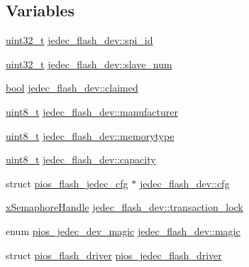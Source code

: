 \subsection*{Variables}
\begin{DoxyCompactItemize}
\item 
\hyperlink{stdint_8h_a435d1572bf3f880d55459d9805097f62}{uint32\-\_\-t} \hyperlink{group___p_i_o_s___f_l_a_s_h_ga0f87de9cf831cf45ad2e81d4629cf021}{jedec\-\_\-flash\-\_\-dev\-::spi\-\_\-id}
\item 
\hyperlink{stdint_8h_a435d1572bf3f880d55459d9805097f62}{uint32\-\_\-t} \hyperlink{group___p_i_o_s___f_l_a_s_h_ga38ca35aafe78e6032326184768221fab}{jedec\-\_\-flash\-\_\-dev\-::slave\-\_\-num}
\item 
\hyperlink{group___exported__types_gaf6a258d8f3ee5206d682d799316314b1}{bool} \hyperlink{group___p_i_o_s___f_l_a_s_h_ga0252ff9aa887c054e7299923b344bf59}{jedec\-\_\-flash\-\_\-dev\-::claimed}
\item 
\hyperlink{stdint_8h_aba7bc1797add20fe3efdf37ced1182c5}{uint8\-\_\-t} \hyperlink{group___p_i_o_s___f_l_a_s_h_gaf7bb5593bcefe3837116c4bdb768cd6e}{jedec\-\_\-flash\-\_\-dev\-::manufacturer}
\item 
\hyperlink{stdint_8h_aba7bc1797add20fe3efdf37ced1182c5}{uint8\-\_\-t} \hyperlink{group___p_i_o_s___f_l_a_s_h_ga68ce126b7f544ebb02fa8beab9b9faa2}{jedec\-\_\-flash\-\_\-dev\-::memorytype}
\item 
\hyperlink{stdint_8h_aba7bc1797add20fe3efdf37ced1182c5}{uint8\-\_\-t} \hyperlink{group___p_i_o_s___f_l_a_s_h_ga4253b6dd4128fd223d200bed60696804}{jedec\-\_\-flash\-\_\-dev\-::capacity}
\item 
struct \hyperlink{structpios__flash__jedec__cfg}{pios\-\_\-flash\-\_\-jedec\-\_\-cfg} $\ast$ \hyperlink{group___p_i_o_s___f_l_a_s_h_ga26db753e18e085086b539aca2438ee45}{jedec\-\_\-flash\-\_\-dev\-::cfg}
\item 
\hyperlink{_common_2_libraries_2_free_r_t_o_s_2_source_2include_2semphr_8h_aa91aa1b6835a184838f9ccf138a6ad10}{x\-Semaphore\-Handle} \hyperlink{group___p_i_o_s___f_l_a_s_h_ga28870637f7372faa2a3fb2bd887a4ab7}{jedec\-\_\-flash\-\_\-dev\-::transaction\-\_\-lock}
\item 
enum \hyperlink{group___p_i_o_s___f_l_a_s_h_ga3e7c01370e9757b84f3a37ec903714f3}{pios\-\_\-jedec\-\_\-dev\-\_\-magic} \hyperlink{group___p_i_o_s___f_l_a_s_h_gaf71b8f686812a43a77983b3ec807aed7}{jedec\-\_\-flash\-\_\-dev\-::magic}
\item 
struct \hyperlink{structpios__flash__driver}{pios\-\_\-flash\-\_\-driver} \hyperlink{group___p_i_o_s___f_l_a_s_h_gab3923a09f07a535164fd799434276f27}{pios\-\_\-jedec\-\_\-flash\-\_\-driver}

\end{DoxyCompactItemize}
